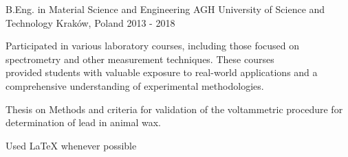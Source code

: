 

\begin{cventries}

  \cventry
    {B.Eng. in Material Science and Engineering} %
    {AGH University of Science and Technology} %
    {Kraków, Poland} %
    {2013 - 2018} %
    {
      \begin{cvitems} %
        \item {Participated in various laboratory courses, including those focused on spectrometry and other measurement techniques. These courses \\ provided students with valuable exposure to real-world applications and a comprehensive understanding of experimental methodologies.}
        \item {Thesis on Methods and criteria for validation of the voltammetric procedure for determination of lead in animal wax.}
        \item {Used \LaTeX\; whenever possible}
      \end{cvitems}
    }

\end{cventries}
